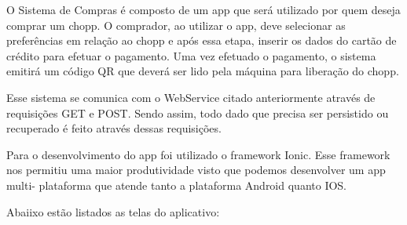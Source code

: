 O Sistema de Compras é composto de um app que será utilizado por
quem deseja comprar um chopp. O comprador, ao utilizar o app, deve selecionar as preferências 
em relação ao chopp e após essa etapa, inserir os dados do cartão de crédito para efetuar o pagamento. 
Uma vez efetuado o pagamento, o sistema emitirá um código QR que deverá ser lido pela máquina
para liberação do chopp.

Esse sistema se comunica com o WebService citado anteriormente através de
requisições GET e POST. Sendo assim, todo dado que precisa ser persistido ou recuperado é feito através
dessas requisições.

Para o desenvolvimento do app foi utilizado o framework Ionic. Esse framework
nos permitiu uma maior produtividade visto que podemos desenvolver um app multi-
plataforma que atende tanto a plataforma Android quanto IOS. 

Abaiixo estão listados as telas do aplicativo:

